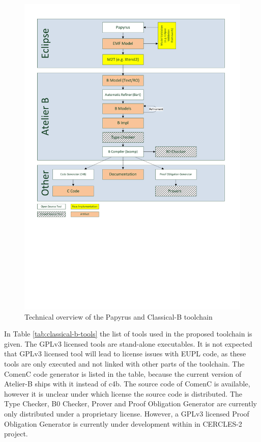 \begin{figure}
  \centering
  \includegraphics[width=6in]{images/classical_b_toolchain.pdf}
  \caption{Technical overview of the Papyrus and Classical-B toolchain}
  \label{fig:classical-b-toolchain}
\end{figure}


In Table \ref{tab:classical-b-tools} the list of tools used in the
proposed toolchain is given. The GPLv3 licensed tools are stand-alone
executables. It is not expected that GPLv3 licensed tool will lead to
license issues with EUPL code, as these tools are only executed and
not linked with other parts of the toolchain. The ComenC code
generator is listed in the table, because the current version of
Atelier-B ships with it instead of c4b. The source code of ComenC is
available, however it is unclear under which license the source code
is distributed. The Type Checker, B0 Checker, Prover and Proof
Obligation Generator are currently only distributed under a
proprietary license. However, a GPLv3 licensed Proof Obligation
Generator is currently under development within in CERCLES-2 project.


